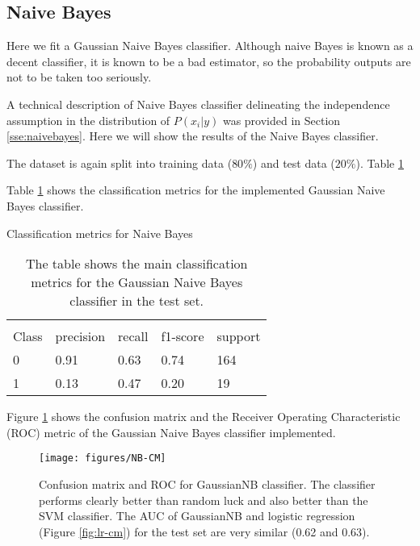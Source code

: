 \documentclass[11pt]{article}
\theoremstyle{definition}
\theoremstyle{remark}
\begin{document}
\subsection{Naive Bayes}
\label{se:resnaivebayes}

Here we fit a Gaussian Naive Bayes classifier. Although naive Bayes is known as a decent classifier, it is known to be a bad estimator, so the probability outputs are not to be taken too seriously. %

A technical description of Naive Bayes classifier delineating the independence assumption in the distribution of $P(x_i | y)$ was provided in Section \ref{sse:naivebayes}. Here we will show the results of the Naive Bayes classifier.

The dataset is again split into training data ($80\%$) and test data ($20\%$). Table \ref{tab:naive}

Table \ref{tab:naive} shows the classification metrics for the implemented Gaussian Naive Bayes classifier.
\begin{table}[H]
\caption{Classification metrics for Naive Bayes} 
\begin{center} 
\begin{tabular}{lllll}
\hline
\multicolumn{1}{c}{} \\
Class & precision & recall & f1-score & support     \\
\hline
0 & 0.91  &    0.63   &   0.74   &    164 \\
1 & 0.13  &    0.47   &   0.20   &    19 \\
\hline
\end{tabular}
\caption{The table shows the main classification metrics for the Gaussian Naive Bayes classifier in the test set.} \label{tab:naive} 
\end{center}
\end{table}

Figure \ref{fig:nb-cm} shows the confusion matrix and the Receiver Operating Characteristic (ROC) metric of the Gaussian Naive Bayes classifier implemented.
\begin{figure}[H]
        \centering
        \texttt{[image: figures/NB-CM]}
        \caption{Confusion matrix and ROC for GaussianNB classifier. The classifier performs clearly better than random luck and also better than the SVM classifier. The AUC of GaussianNB and logistic regression (Figure \ref{fig:lr-cm}) for the test set  are very similar (0.62 and 0.63).} \label{fig:nb-cm}
\end{figure}
\end{document}
